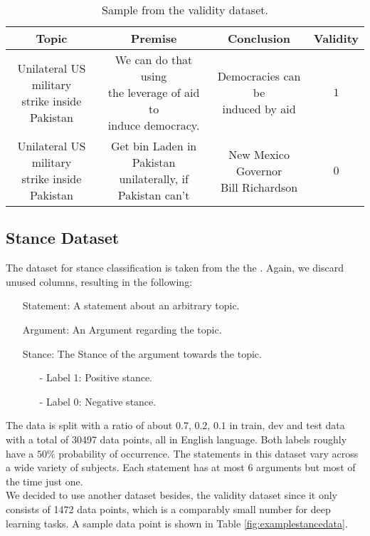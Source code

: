 \begin{table}[H]
	\begin{center}
	\footnotesize
   	\begin{tabular}{|| c | c | c | c||}
   	\hline
   	Topic & Premise & Conclusion & Validity \\
   	\hline\hline
   	\makecell{Unilateral US military \\ strike inside Pakistan} & \makecell{We can do that using \\ the leverage of aid to \\ induce democracy.} & \makecell{Democracies can be \\ induced by aid} & $1$ \\
   	\hline
   	\makecell{Unilateral US military \\ strike inside Pakistan} & \makecell{Get bin Laden in Pakistan \\ unilaterally, if Pakistan can't} & \makecell{New Mexico Governor \\ Bill Richardson} & $0$ \\
 	\hline
	\end{tabular}
  \end{center}
	\caption{Sample from the validity dataset.}%
  	\label{fig:examplevaliditydata}
\end{table}

\subsection{Stance Dataset} \label{sec:stancedata}

The dataset for stance classification is taken from the the  \cite{stancedata, ibm}. Again, we discard unused columns, resulting in the following:
\begin{enumerate}
	\item[\textbullet] Statement: A statement about an arbitrary topic.
	\item[\textbullet] Argument: An Argument regarding the topic.
	\item[\textbullet] Stance: The Stance of the argument towards the topic.
	\begin{enumerate}
		\item[-] Label 1: Positive stance.
		\item[-] Label 0: Negative stance.
	\end{enumerate}
\end{enumerate}
The data is split with a ratio of about $0.7$, $0.2$, $0.1$ in train, dev and test data with a total of \num[group-separator={,}]{30497} data points, all in English language. Both labels roughly have a $50\%$ probability of occurrence. The statements in this dataset vary across a wide variety of subjects. Each statement has at most $6$ arguments \cite{stancedata} but most of the time just one. \\
We decided to use another dataset besides, the validity dataset since it only consists of \num[group-separator={,}]{1472} data points, which is a comparably small number for deep learning tasks. A sample data point is shown in Table \ref{fig:examplestancedata}.

